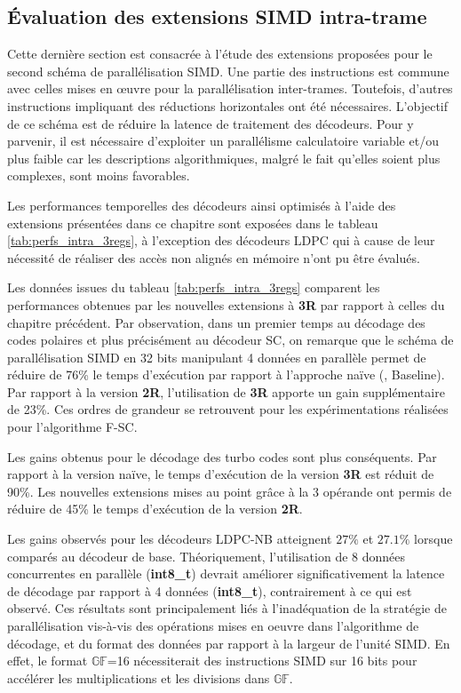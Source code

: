 \documentclass[../main.tex]{subfiles}
\begin{document}
\subsection{Évaluation des extensions SIMD intra-trame}
%
%
%
Cette dernière section est consacrée à l'étude des extensions proposées pour le second schéma de parallélisation SIMD. 
Une partie des instructions est commune avec celles mises en œuvre pour la parallélisation inter-trames. 
Toutefois, d'autres instructions impliquant des réductions horizontales ont été nécessaires. L'objectif de ce schéma est de réduire la latence de traitement des décodeurs. 
Pour y parvenir, il est nécessaire d'exploiter un parallélisme calculatoire variable et/ou plus faible car les descriptions algorithmiques, malgré le fait qu'elles soient plus complexes, sont moins favorables.

Les performances temporelles des décodeurs ainsi optimisés à l'aide des extensions présentées dans ce chapitre sont exposées dans le tableau \ref{tab:perfs_intra_3regs}, à l'exception des décodeurs LDPC qui à cause de leur nécessité de réaliser des accès non alignés en mémoire n'ont pu être évalués.

Les données issues du tableau \ref{tab:perfs_intra_3regs} comparent les performances obtenues par les nouvelles extensions à \textbf{3R} par rapport à celles du chapitre précédent.
Par observation, dans un premier temps au décodage des codes polaires et plus précisément au décodeur SC, on remarque que le schéma de parallélisation SIMD en 32 bits manipulant 4 données en parallèle permet de réduire de 76\% le temps d'exécution par rapport à l'approche naïve (, Baseline).
Par rapport à la version \textbf{2R}, l'utilisation de \textbf{3R} apporte un gain supplémentaire de 23\%.
Ces ordres de grandeur se retrouvent pour les expérimentations réalisées pour l'algorithme F-SC.

Les gains obtenus pour le décodage des turbo codes sont plus conséquents. Par rapport à la version naïve, le temps d'exécution de la version \textbf{3R} est réduit de 90\%.
Les nouvelles extensions mises au point grâce à la 3 opérande ont permis de réduire de 45\% le temps d'exécution de la version \textbf{2R}.

Les gains observés pour les décodeurs LDPC-NB atteignent $27\%$ et $27.1\%$ lorsque comparés au décodeur de base. Théoriquement, l'utilisation de 8 données concurrentes en parallèle (\textbf{int8\_t}) devrait améliorer significativement la latence de décodage par rapport à 4 données (\textbf{int8\_t}), contrairement à ce qui est observé.
Ces résultats sont principalement liés à l'inadéquation de la stratégie de parallélisation vis-à-vis des opérations mises en oeuvre dans l'algorithme de décodage, et du format des données par rapport à la largeur de l'unité SIMD.
En effet, le format $\mathbb{GF}$=16 nécessiterait des instructions SIMD sur 16 bits pour accélérer les multiplications et les divisions dans $\mathbb{GF}$.
\end{document}
